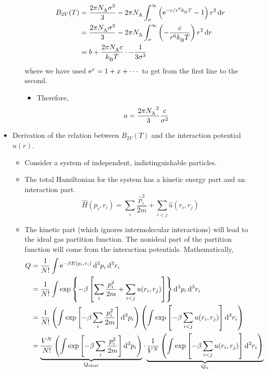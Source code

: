 \documentclass[../notes.tex]{subfiles}
\begin{document}
\begin{itemize}
\begin{itemize}
        \begin{align*}
            B_{2V}(T) &= \frac{2\pi\NA\sigma^3}{3}-2\pi\NA\int_\sigma^\infty\left( \e[-c/r^6\kB T]-1 \right)r^2\dd{r}\\
            &= \frac{2\pi\NA\sigma^3}{3}-2\pi\NA\int_\sigma^\infty\left( -\frac{c}{r^6\kB T} \right)r^2\dd{r}\\
            &= b+\frac{2\pi\NA c}{\kB T}\cdot-\frac{1}{3\sigma^3}
        \end{align*}
        where we have used $\e[x]=1+x+\cdots$ to get from the first line to the second.
        \begin{itemize}
            \item Therefore,
            \begin{equation*}
                a = \frac{2\pi\NA^2}{3}\frac{c}{\sigma^2}
            \end{equation*}
        \end{itemize}
    \end{itemize}
    \item Derivation of the relation between $B_{2V}(T)$ and the interaction potential $u(r)$.
    \begin{itemize}
        \item Consider a system of independent, indistinguishable particles.
        \item The total Hamiltonian for the system has a kinetic energy part and an interaction part.
        \begin{equation*}
            \hat{H}(p_i,r_i) = \sum_i\frac{\hat{p}_i^2}{2m}+\sum_{i<j}\hat{u}(r_i,r_j)
        \end{equation*}
        \item The kinetic part (which ignores intermolecular interactions) will lead to the ideal gas partition function. The nonideal part of the partition function will come from the interaction potentials. Mathematically,
        \begin{align*}
            Q &= \frac{1}{N!}\int\e[-\beta E(p_i,r_i)]\dd[3]{p_i}\dd[3]{r_i}\\
            &= \frac{1}{N!}\int\exp\left\{ -\beta\left[ \sum_i\frac{p_i^2}{2m}+\sum_{i<j}u(r_i,r_j) \right] \right\}\dd[3]{p_i}\dd[3]{r_i}\\
            &= \frac{1}{N!}\left( \int\exp\left[ -\beta\sum_i\frac{p_i^2}{2m} \right]\dd[3]{p_i} \right)\left( \int\exp\left[ -\beta\sum_{i<j}u(r_i,r_j) \right]\dd[3]{r_i} \right)\\
            &= \underbrace{\frac{V^N}{N!}\left( \int\exp\left[ -\beta\sum_i\frac{p_i^2}{2m} \right]\dd[3]{p_i} \right)}_{Q_\text{ideal}}\cdot\underbrace{\frac{1}{V^N}\left( \int\exp\left[ -\beta\sum_{i<j}u(r_i,r_j) \right]\dd[3]{r_i} \right)}_{Q_u}

\end{align*}
\end{itemize}
\end{itemize}
\end{document}
